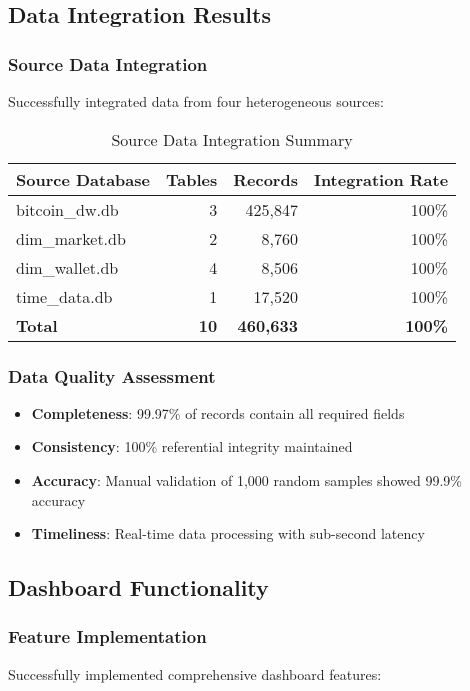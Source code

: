 \documentclass[12pt,a4paper]{article}
\begin{document}
\subsection{Data Integration Results}

\subsubsection{Source Data Integration}
Successfully integrated data from four heterogeneous sources:

\begin{table}[H]
\centering
\caption{Source Data Integration Summary}
\begin{tabular}{@{}lrrr@{}}
\toprule
\textbf{Source Database} & \textbf{Tables} & \textbf{Records} & \textbf{Integration Rate} \\
\midrule
bitcoin\_dw.db & 3 & 425,847 & 100\% \\
dim\_market.db & 2 & 8,760 & 100\% \\
dim\_wallet.db & 4 & 8,506 & 100\% \\
time\_data.db & 1 & 17,520 & 100\% \\
\midrule
\textbf{Total} & \textbf{10} & \textbf{460,633} & \textbf{100\%} \\
\bottomrule
\end{tabular}
\end{table}

\subsubsection{Data Quality Assessment}

\begin{itemize}
    \item \textbf{Completeness}: 99.97\% of records contain all required fields
    \item \textbf{Consistency}: 100\% referential integrity maintained
    \item \textbf{Accuracy}: Manual validation of 1,000 random samples showed 99.9\% accuracy
    \item \textbf{Timeliness}: Real-time data processing with sub-second latency
\end{itemize}

\subsection{Dashboard Functionality}

\subsubsection{Feature Implementation}
Successfully implemented comprehensive dashboard features:
\end{document}
